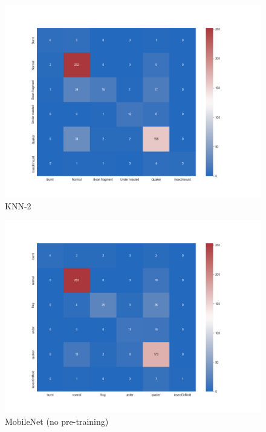 \begin{figure} %
    \centering
    \includegraphics[width=\textwidth]{figures/confusionMatrices/KNN-2}
    \caption{KNN-2}
    \label{fig:knn-2}
\end{figure}

\begin{figure}
    \centering
    \includegraphics[width=\textwidth]{figures/confusionMatrices/mobileNet-no-pretraining0-5gamma}
    \caption{MobileNet (no pre-training)}
    \label{fig:mobileNetNoPt}
\end{figure}

